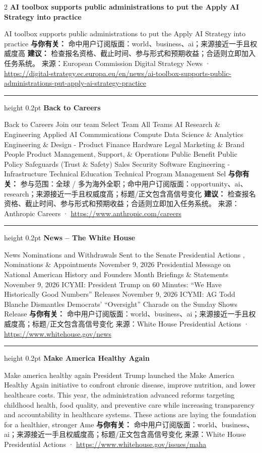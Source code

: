 \documentclass[10.5pt]{ctexart}
\begin{document}
\begin{multicols}{2}
{\large\bfseries AI toolbox supports public administrations to put the Apply AI Strategy into practice}\par
AI toolbox supports public administrations to put the Apply AI Strategy into practice
\textbf{与你有关：} 命中用户订阅版面：world、business、ai；来源接近一手且权威度高
\textbf{建议：} 检查报名资格、截止时间、参与形式和预期收益；合适则立即加入任务系统。
{\footnotesize\color{ormuted} 来源：European Commission Digital Strategy News · \url{https://digital-strategy.ec.europa.eu/en/news/ai-toolbox-supports-public-administrations-put-apply-ai-strategy-practice}}
\vspace{2mm}
\hrule height 0.2pt
\vspace{2mm}
{\large\bfseries Back to Careers}\par
Back to Careers Join our team Select Team All Teams AI Research \& Engineering Applied AI Communications Compute Data Science \& Analytics Engineering \& Design - Product Finance Hardware Legal Marketing \& Brand People Product Management, Support, \& Operations Public Benefit Public Policy Safeguards (Trust \& Safety) Sales Security Software Engineering - Infrastructure Technical Education Technical Program Management Sel
\textbf{与你有关：} 参与范围：全球 / 多为海外全职；命中用户订阅版面：opportunity、ai、research；来源接近一手且权威度高；标题/正文包含高信号变化
\textbf{建议：} 检查报名资格、截止时间、参与形式和预期收益；合适则立即加入任务系统。
{\footnotesize\color{ormuted} 来源：Anthropic Careers · \url{https://www.anthropic.com/careers}}
\vspace{2mm}
\hrule height 0.2pt
\vspace{2mm}
{\large\bfseries News – The White House}\par
News Nominations and Withdrawals Sent to the Senate Presidential Actions , Nominations \& Appointments November 9, 2026 Presidential Message on National American History and Founders Month Briefings \& Statements November 9, 2026 ICYMI: President Trump on 60 Minutes: “We Have Historically Good Numbers” Releases November 9, 2026 ICYMI: AG Todd Blanche Dismantles Democrats’ “Oversight” Charade on the Sunday Shows Release
\textbf{与你有关：} 命中用户订阅版面：world、business、ai；来源接近一手且权威度高；标题/正文包含高信号变化
{\footnotesize\color{ormuted} 来源：White House Presidential Actions · \url{https://www.whitehouse.gov/news}}
\vspace{2mm}
\hrule height 0.2pt
\vspace{2mm}
{\large\bfseries Make America Healthy Again}\par
Make america healthy again President Trump launched the Make America Healthy Again initiative to confront chronic disease, improve nutrition, and lower healthcare costs. This year, the administration advanced reforms targeting childhood health, food quality, and preventive care while increasing transparency and accountability in healthcare systems. These actions are laying the foundation for a healthier, stronger Ame
\textbf{与你有关：} 命中用户订阅版面：world、business、ai；来源接近一手且权威度高；标题/正文包含高信号变化
{\footnotesize\color{ormuted} 来源：White House Presidential Actions · \url{https://www.whitehouse.gov/issues/maha}}
\end{multicols}
\end{document}
